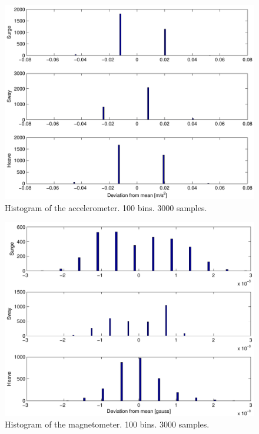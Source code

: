          

\begin{figure}[htpb]
	\centering
	\includegraphics[width=\textwidth]{pdf/acclhist3000}
	\caption{Histogram of the accelerometer. 100 bins. 3000 samples.}
	\label{fig:acclhist3000}
\end{figure}

\begin{figure}[htpb]
	\centering
	\includegraphics[width=\textwidth]{pdf/magnhist3000}
	\caption{Histogram of the magnetometer. 100 bins. 3000 samples.}
	\label{fig:magnhist3000}
\end{figure}

